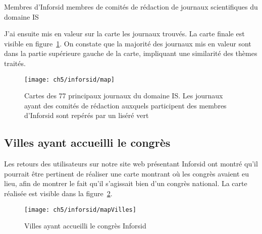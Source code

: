 			\begin{table}[p]
				\centering
				\caption{Membres d\rq{}Inforsid membres de comités de rédaction de journaux scientifiques du domaine IS}\label{tab:boards}
				
			\end{table}
			
			
%				
			
			J'ai ensuite mis en valeur sur la carte les journaux trouvés. La carte finale est visible en figure~\ref{fig:map}. On constate que la majorité des journaux mis en valeur sont dans la partie supérieure gauche de la carte, impliquant une similarité des thèmes traités.
			
			\begin{figure}[ht]
				\centering
				\texttt{[image: ch5/inforsid/map]}
				\caption{Cartes des 77 principaux journaux du domaine IS. Les journaux ayant des comités de rédaction auxquels participent des membres d\rq{}Inforsid sont repérés par un liséré vert}\label{fig:map}
			\end{figure}
		
		
		\subsection{Villes ayant accueilli le congrès}
			Les retours des utilisateurs sur notre site web présentant Inforsid ont montré qu'il pourrait être pertinent de réaliser une carte montrant où les congrès avaient eu lieu, afin de montrer le fait qu'il s'agissait bien d'un congrès national. La carte réalisée est visible dans la figure~\ref{fig:mapVilles}.
			
			\begin{figure}[h]
				\centering
				\texttt{[image: ch5/inforsid/mapVilles]}
				\caption{Villes ayant accueilli le congrès Inforsid}\label{fig:mapVilles}
			\end{figure}
	
